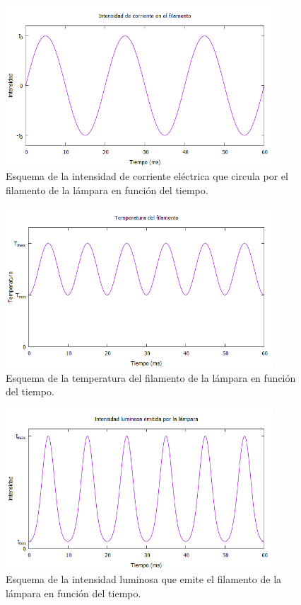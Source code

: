 \documentclass[12pt]{article}
\numberwithin{table}{section}
\numberwithin{figure}{section}
\numberwithin{equation}{section}
\begin{document}
\begin{figure}[!ht]
	\begin{center}
		\includegraphics[width=10cm]{P10Intensidadfilamento.png}
		\caption{Esquema de la intensidad de corriente eléctrica que circula por el filamento de la lámpara en función del tiempo.}\label{P10intensidadfilamento}
	\end{center}
\end{figure}
\begin{figure}[!ht]
	\begin{center}
		\includegraphics[width=10cm]{P10Temperatura.png}
		\caption{Esquema de la temperatura del filamento de la lámpara en función del tiempo.}\label{P10temperatura}
	\end{center}
\end{figure}
\begin{figure}[!ht]
	\begin{center}
		\includegraphics[width=10cm]{P10Intensidadluminosa.png}
		\caption{Esquema de la intensidad luminosa que emite el filamento de la lámpara en función del tiempo.}\label{P10intensidadluminosa}
	\end{center}
\end{figure}
\end{document}
